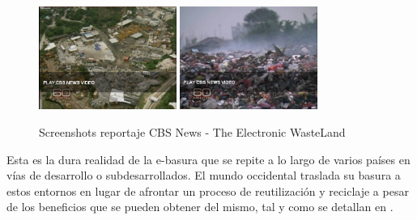 \begin{figure}[H]
\begin{center}
\includegraphics[width=0.4\textwidth]{img/screen5}
\includegraphics[width=0.4\textwidth]{img/screen6}
\caption{Screenshots reportaje CBS News - The Electronic WasteLand}
\end{center}
\end{figure}


Esta es la dura realidad de la e-basura que se repite a lo largo de varios países en vías de desarrollo o subdesarrollados. El mundo occidental traslada su basura a estos entornos en lugar de afrontar un proceso de reutilización y reciclaje a pesar de los beneficios que se pueden obtener del mismo, tal y como se detallan en \cite{reusing-silicon}.